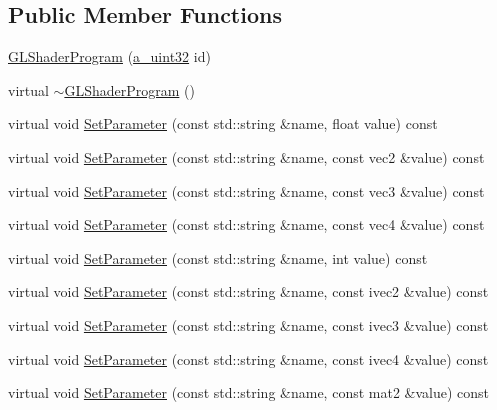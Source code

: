 \subsection*{Public Member Functions}
\begin{DoxyCompactItemize}
\item 
\hyperlink{class_agmd_1_1_g_l_shader_program_a1a2eb9734397669c478cf85df53ba8e9}{G\+L\+Shader\+Program} (\hyperlink{_common_defines_8h_a964296f9770051b9e4807b1f180dd416}{a\+\_\+uint32} id)
\item 
virtual \hyperlink{class_agmd_1_1_g_l_shader_program_a4f31d9a8c06a6d169cf30130762d28fe}{$\sim$\+G\+L\+Shader\+Program} ()
\item 
virtual void \hyperlink{class_agmd_1_1_g_l_shader_program_afae2c3235c58471dd70a5ac00403551e}{Set\+Parameter} (const std\+::string \&name, float value) const 
\item 
virtual void \hyperlink{class_agmd_1_1_g_l_shader_program_a04781da02adda9e43dafdea76e9a52a7}{Set\+Parameter} (const std\+::string \&name, const vec2 \&value) const 
\item 
virtual void \hyperlink{class_agmd_1_1_g_l_shader_program_a038d3776efb633a375ed23b708d18dd5}{Set\+Parameter} (const std\+::string \&name, const vec3 \&value) const 
\item 
virtual void \hyperlink{class_agmd_1_1_g_l_shader_program_a656e3738edaec1614749374c0a76a96b}{Set\+Parameter} (const std\+::string \&name, const vec4 \&value) const 
\item 
virtual void \hyperlink{class_agmd_1_1_g_l_shader_program_ac6fb42381ab6cfaf551448553e4c0814}{Set\+Parameter} (const std\+::string \&name, int value) const 
\item 
virtual void \hyperlink{class_agmd_1_1_g_l_shader_program_abfff9538605f09bed55dd29dd140d5b2}{Set\+Parameter} (const std\+::string \&name, const ivec2 \&value) const 
\item 
virtual void \hyperlink{class_agmd_1_1_g_l_shader_program_a5ab2f483358c1302547aed7271c6a84f}{Set\+Parameter} (const std\+::string \&name, const ivec3 \&value) const 
\item 
virtual void \hyperlink{class_agmd_1_1_g_l_shader_program_a35163ff82e1594cc6c21255b39928c6e}{Set\+Parameter} (const std\+::string \&name, const ivec4 \&value) const 
\item 
virtual void \hyperlink{class_agmd_1_1_g_l_shader_program_a3a4433064ce0fda49166f5fff3b3267d}{Set\+Parameter} (const std\+::string \&name, const mat2 \&value) const 
\item 

\end{DoxyCompactItemize}
